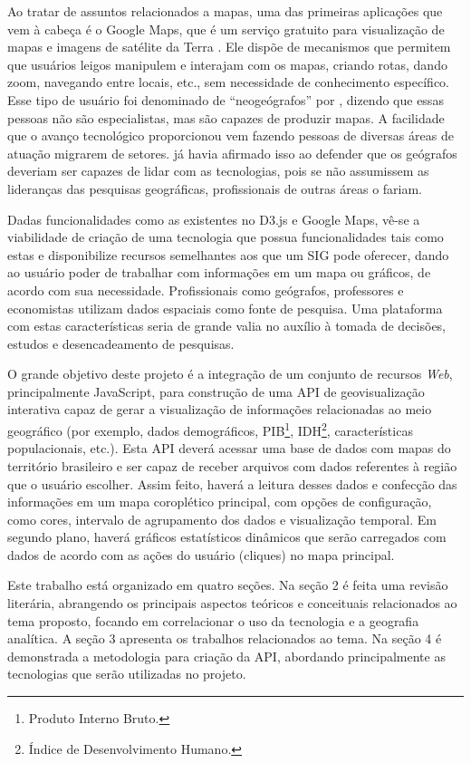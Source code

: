 \documentclass[12pt]{article}
\begin{document}
Ao tratar de assuntos relacionados a mapas, uma das primeiras aplicações que vem à cabeça é o Google Maps, que é um serviço gratuito para visualização de mapas e imagens de satélite da Terra \citep{googlemaps}. Ele dispõe de mecanismos que permitem que usuários leigos manipulem e interajam com os mapas, criando rotas, dando zoom, navegando entre locais, etc., sem necessidade de conhecimento específico. Esse tipo de usuário foi denominado de “neogeógrafos” por \citet{turner}, dizendo que essas pessoas não são especialistas, mas são capazes de produzir mapas. A facilidade que o avanço tecnológico proporcionou vem fazendo pessoas de diversas áreas de atuação migrarem de setores. \citet{armstrong} já havia afirmado isso ao defender que os geógrafos deveriam ser capazes de lidar com as tecnologias, pois se não assumissem as lideranças das pesquisas geográficas, profissionais de outras áreas o fariam.

Dadas funcionalidades como as existentes no D3.js e Google Maps, vê-se a viabilidade de criação de uma tecnologia que possua funcionalidades tais como estas e disponibilize recursos semelhantes aos que um SIG pode oferecer, dando ao usuário poder de trabalhar com informações em um mapa ou gráficos, de acordo com sua necessidade. Profissionais como geógrafos, professores e economistas utilizam dados espaciais como fonte de pesquisa. Uma plataforma com estas características seria de grande valia no auxílio à tomada de decisões, estudos e desencadeamento de pesquisas.

O grande objetivo deste projeto é a integração de um conjunto de recursos \emph{Web}, principalmente JavaScript, para construção de uma API de geovisualização interativa capaz de gerar a visualização de informações relacionadas ao meio geográfico (por exemplo, dados demográficos, PIB\footnote{Produto Interno Bruto.}, IDH\footnote{Índice de Desenvolvimento Humano.}, características populacionais, etc.). Esta API deverá acessar uma base de dados com mapas do território brasileiro e ser capaz de receber arquivos com dados referentes à região que o usuário escolher. Assim feito, haverá a leitura desses dados e confecção das informações em um mapa coroplético principal, com opções de configuração, como cores, intervalo de agrupamento dos dados e visualização temporal. Em segundo plano, haverá gráficos estatísticos dinâmicos que serão carregados com dados de acordo com as ações do usuário (cliques) no mapa principal.

Este trabalho está organizado em quatro seções. Na seção 2 é feita uma revisão literária, abrangendo os principais aspectos teóricos e conceituais relacionados ao tema proposto, focando em correlacionar o uso da tecnologia e a geografia analítica. A seção 3 apresenta os trabalhos relacionados ao tema. Na seção 4 é demonstrada a metodologia para criação da API, abordando principalmente as tecnologias que serão utilizadas no projeto.
\end{document}
